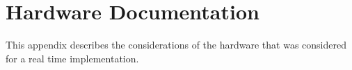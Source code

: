 \section{Hardware Documentation}\label{sec:HardwareDocumentation}

This appendix describes the considerations of the hardware that was considered for a real time implementation. 


	
	
	
	
